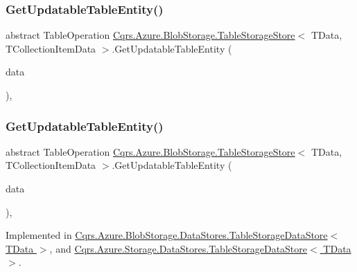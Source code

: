 \subsubsection{\texorpdfstring{Get\+Updatable\+Table\+Entity()}{GetUpdatableTableEntity()}\hspace{0.1cm}{\footnotesize\ttfamily [1/2]}}
{\footnotesize\ttfamily abstract Table\+Operation \hyperlink{classCqrs_1_1Azure_1_1BlobStorage_1_1TableStorageStore}{Cqrs.\+Azure.\+Blob\+Storage.\+Table\+Storage\+Store}$<$ T\+Data, T\+Collection\+Item\+Data $>$.Get\+Updatable\+Table\+Entity (\begin{DoxyParamCaption}\item[{T\+Collection\+Item\+Data}]{data }\end{DoxyParamCaption})\hspace{0.3cm}{\ttfamily [protected]}, {}}

\mbox{\label{classCqrs_1_1Azure_1_1BlobStorage_1_1TableStorageStore_ae476c94b77d9c602aef934bd8c1b20ea}} 
\subsubsection{\texorpdfstring{Get\+Updatable\+Table\+Entity()}{GetUpdatableTableEntity()}\hspace{0.1cm}{\footnotesize\ttfamily [2/2]}}
{\footnotesize\ttfamily abstract Table\+Operation \hyperlink{classCqrs_1_1Azure_1_1BlobStorage_1_1TableStorageStore}{Cqrs.\+Azure.\+Blob\+Storage.\+Table\+Storage\+Store}$<$ T\+Data, T\+Collection\+Item\+Data $>$.Get\+Updatable\+Table\+Entity (\begin{DoxyParamCaption}\item[{T\+Data}]{data }\end{DoxyParamCaption})\hspace{0.3cm}{\ttfamily [protected]}, {}}



Implemented in \hyperlink{classCqrs_1_1Azure_1_1BlobStorage_1_1DataStores_1_1TableStorageDataStore_aa4dc1bfeeb55483b68d8af3414000f7a}{Cqrs.\+Azure.\+Blob\+Storage.\+Data\+Stores.\+Table\+Storage\+Data\+Store$<$ T\+Data $>$}, and \hyperlink{classCqrs_1_1Azure_1_1Storage_1_1DataStores_1_1TableStorageDataStore_a54f00f53521e285568f19c29527d6466}{Cqrs.\+Azure.\+Storage.\+Data\+Stores.\+Table\+Storage\+Data\+Store$<$ T\+Data $>$}.

